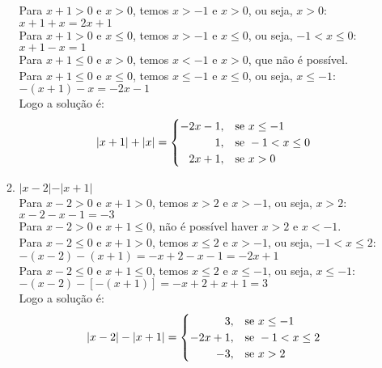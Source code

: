 \documentclass[10pt]{book}
\begin{document}
\begin{enumerate}
\begin{enumerate}
			Para $x + 1 > 0$ e $x > 0$, temos $x > -1$ e $x > 0$, ou seja, $x > 0$:\\
			$x + 1 + x = 2x + 1$\\
			Para $x + 1 > 0$ e $x \leq 0$, temos $x > -1$ e $x \leq 0$, ou seja, $-1 < x \leq 0$:\\
			$x + 1 - x = 1$\\
			Para $x + 1 \leq 0$ e $x > 0$, temos $x < -1$ e $x > 0$, que não é possível.\\
			Para $x + 1 \leq 0$ e $x \leq 0$, temos $x \leq -1$ e $x \leq 0$, ou seja, $x \leq -1$:\\		
			$-(x + 1) -x = -2x - 1$\\
			Logo a solução é:\\
			\begin{equation*}
		    	\vert x + 1 \vert + \vert x \vert =
			    \begin{cases}
			      -2x - 1, & \text{se}\ x \leq -1 \\
			      \hfill 1, & \text{se}\ -1 < x \leq 0 \\
			      \hfill 2x + 1, & \text{se}\ x > 0 
		    	\end{cases}
			\end{equation*}
			\item
			$\vert x - 2\vert - \vert x + 1 \vert$\\
			Para $x - 2 > 0$ e $x + 1 > 0$, temos $x > 2$ e $x > -1$, ou seja, $x > 2$:\\
			$x - 2 - x - 1 = -3$\\
			Para $x - 2 > 0$ e $x + 1 \leq 0$, não é possível haver $x > 2$ e $ x < -1$.\\
			Para $x - 2 \leq 0$ e $x + 1 > 0$, temos $x \leq 2$ e $x > -1$, ou seja, $-1 < x \leq 2$:\\
			$-(x - 2) - (x + 1) = -x + 2 - x - 1 = -2x + 1$\\
			Para $x - 2 \leq 0$ e $x + 1 \leq 0$, temos $x \leq 2$ e $x \leq -1$, ou seja, $x \leq -1$:\\
			$-(x - 2) - [-(x + 1)] = -x + 2 + x + 1 = 3$\\
			Logo a solução é:\\
			\begin{equation*}
		    	\vert x - 2 \vert - \vert x + 1 \vert =
			    \begin{cases}
			      \hfill 3, & \text{se}\ x \leq -1 \\
			      -2x + 1, & \text{se}\ -1 < x \leq 2 \\
			      \hfill -3, & \text{se}\ x > 2 
		    	\end{cases}
			\end{equation*}
		\end{enumerate}
\end{enumerate}
\end{document}
